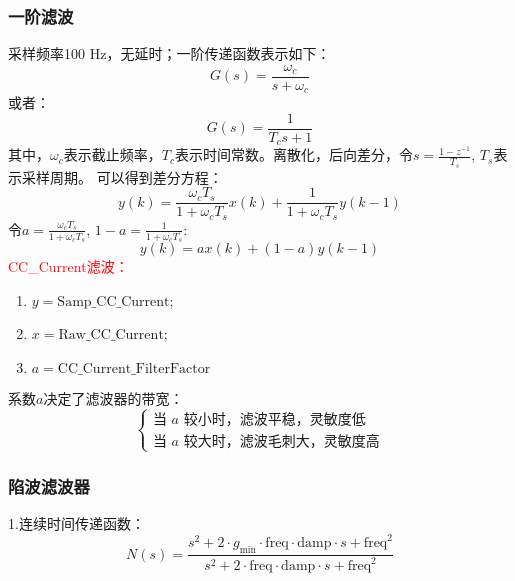     \subsubsection*{一阶滤波}
        采样频率100 Hz，无延时；一阶传递函数表示如下：
            \begin{equation}
                G(s) = \frac{\omega_c}{s+\omega_c}
                \label{eq:CC2}
            \end{equation}
        或者：
            \begin{equation}
                G(s) = \frac{1}{T_cs+1}
                \label{eq:CC3}
            \end{equation}
        其中，$\omega_c$表示截止频率，$T_c$表示时间常数。离散化，后向差分，令$s = \frac{1-z^{-1}}{T_s}$, $T_s$表示采样周期。
        可以得到差分方程：
            \begin{equation}
                y(k) = \frac{\omega_cT_s}{1+\omega_cT_s}x(k)+\frac{1}{1+\omega_cT_s}y(k-1)
            \end{equation}
        令$a = \frac{\omega_cT_s}{1+\omega_cT_s}$, $1-a = \frac{1}{1+\omega_cT_s} $:
            \begin{equation}
                y(k) = ax(k)+(1-a)y(k-1)
                \label{eq:CC4}
            \end{equation}
        \textcolor{red}{CC\_Current滤波：}
            \begin{enumerate}[label={}]
                \item $y = \mathrm{Samp\_CC\_Current} $;
                \item $x = \mathrm{Raw\_CC\_Current} $;
                \item $a = \mathrm{CC\_Current\_FilterFactor}$
            \end{enumerate}
        系数$a$决定了滤波器的带宽：
            \begin{equation}
                \begin{cases}
                    \text{当 $a$ 较小时，滤波平稳，灵敏度低}\\
                    \text{当 $a$ 较大时，滤波毛刺大，灵敏度高}
                \end{cases}
            \end{equation}

        \subsubsection*{陷波滤波器}
            1.连续时间传递函数：
                \begin{equation}
                    N(s) = \frac{s^2 + 2\cdot g_\mathrm{min} \cdot \mathrm{freq} \cdot \mathrm{damp}\cdot s + \mathrm{freq}^2}{s^2 + 2\cdot \mathrm{freq} \cdot \mathrm{damp} \cdot s + \mathrm{freq}^2}
                    \label{eq:Cxb}
                \end{equation}
          
